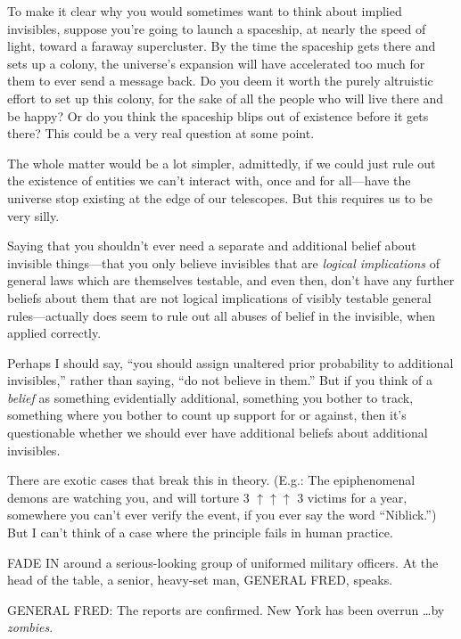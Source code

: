 {
 To make it clear why you would sometimes want to think about
implied invisibles, suppose you're going to launch a
spaceship, at nearly the speed of light, toward a faraway supercluster.
By the time the spaceship gets there and sets up a colony, the
universe's expansion will have accelerated too much for
them to ever send a message back. Do you deem it worth the purely
altruistic effort to set up this colony, for the sake of all the people
who will live there and be happy? Or do you think the spaceship blips
out of existence before it gets there? This could be a very real
question at some point.}

{
 The whole matter would be a lot simpler, admittedly, if we could
just rule out the existence of entities we can't
interact with, once and for all---have the universe stop existing at
the edge of our telescopes. But this requires us to be very silly.}

{
 Saying that you shouldn't ever need a separate and
additional belief about invisible things---that you only believe
invisibles that are \textit{logical implications} of general laws which
are themselves testable, and even then, don't have any
further beliefs about them that are not logical implications of visibly
testable general rules---actually does seem to rule out all abuses of
belief in the invisible, when applied correctly.}

{
 Perhaps I should say, ``you should assign
unaltered prior probability to additional
invisibles,'' rather than saying,
``do not believe in them.'' But if
you think of a \textit{belief} as something evidentially additional,
something you bother to track, something where you bother to count up
support for or against, then it's questionable whether
we should ever have additional beliefs about additional invisibles.}

{
 There are exotic cases that break this in theory. (E.g.: The
epiphenomenal demons are watching you, and will torture 3 $\uparrow
\uparrow \uparrow $ 3 victims for a year, somewhere you
can't ever verify the event, if you ever say the word
``Niblick.'') But I
can't think of a case where the principle fails in
human practice.}

\myendsectiontext


{
 FADE IN around a serious-looking group of uniformed military
officers. At the head of the table, a senior, heavy-set man, GENERAL
FRED, speaks.}

{
 GENERAL FRED: The reports are confirmed. New York has been overrun
\ldots by \textit{zombies}.}

